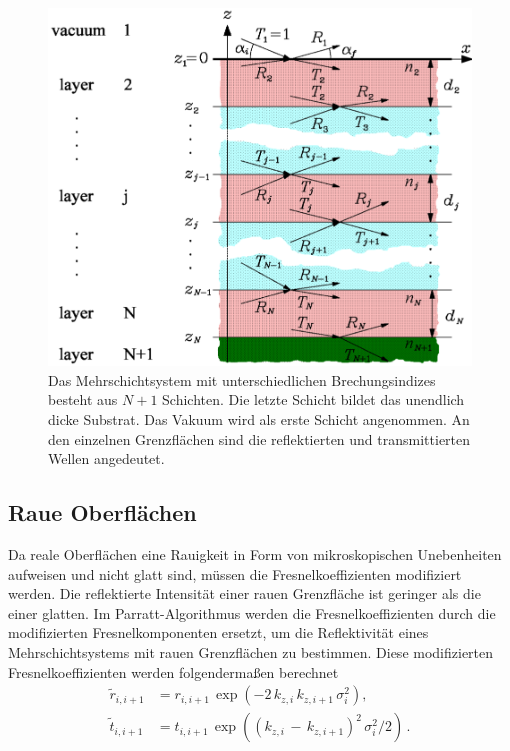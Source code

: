 \begin{figure}
    \centering
    \includegraphics[width=0.7\linewidth]{./figures/Mehrschicht.png}
    \caption{Das Mehrschichtsystem mit unterschiedlichen Brechungsindizes besteht aus $N+1$ Schichten. Die letzte Schicht bildet das unendlich dicke Substrat. Das Vakuum wird als erste Schicht angenommen. An den einzelnen Grenzflächen sind die reflektierten und transmittierten Wellen angedeutet. \cite{V44old}}
    \label{fig:Mehrschicht}
\end{figure}


\subsection{Raue Oberflächen}
Da reale Oberflächen eine Rauigkeit in Form von mikroskopischen Unebenheiten aufweisen und nicht glatt sind, müssen die Fresnelkoeffizienten modifiziert werden. Die reflektierte Intensität einer rauen Grenzfläche ist geringer als die einer glatten. Im Parratt-Algorithmus werden die Fresnelkoeffizienten durch die modifizierten Fresnelkomponenten ersetzt, um die Reflektivität eines Mehrschichtsystems mit rauen Grenzflächen zu bestimmen. Diese modifizierten Fresnelkoeffizienten werden folgendermaßen berechnet
\begin{align*}
    \tilde{r}_{i,i+1} &= r_{i,i+1} \, \exp(-2 \, k_{z,i} \, k_{z,i+1} \, \sigma^2_i), \\
    \tilde{t}_{i,i+1} &= t_{i,i+1} \, \exp((k_{z,i} \, - \, k_{z,i+1})^2 \, \sigma^2_i / 2) \, .
\end{align*}



